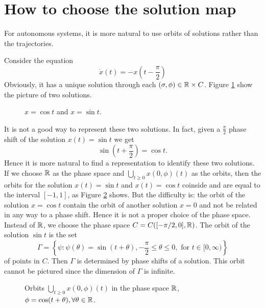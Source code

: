 \section{How to choose the solution map}
For autonomous systems, it is more natural to use orbits of solutions rather than the trajectories.
\begin{example}
Consider the equation
\begin{equation}\label{eqn-2}
  \dot{x}(t)=-x\left( t- \frac{\pi}{2} \right) 
\end{equation}
Obviously, it has a unique solution through each $(\sigma,\phi)\in \mathbb{R}\times C$. Figure \ref{fig-1} show the picture of two solutions.
\begin{figure}[ht]
  \centering
  \caption{$x=\cos t$ and $x=\sin t$.}
  \label{fig-1}
\end{figure}
It is not a good way to represent these two solutions. In fact, given a $\frac{\pi}{2}$ phase shift of the solution $x(t)=\sin t$ we get 
\[
  \sin(t+\frac{\pi}{2})=\cos t.
\] 
Hence it is more natural to find a representation to identify these two solutions. If we choose $\mathbb{R}$ as the phase space and $\bigcup_{t\ge 0}x(0,\phi)(t)$ as the orbits, then the orbits for the solution $x(t)=\sin t$ and $x(t)=\cos t$ coinside and are equal to the interval $[-1,1]$, as Figure \ref{fig-2} shows. But the difficulty is: the orbit of the solution $x=\cos t$ contain the orbit of another solution $x=0$ and not be related in any way to a phase shift. Hence it is not a proper choice of the phase space. Instead of $\mathbb{R}$, we choose the phase space $C=C([-\pi /2,0],\mathbb{R})$. The orbit of the solution $\sin t$ is the set 
\begin{equation}
  \Gamma=\left\{\psi:\psi(\theta)=\sin(t+\theta), -\frac{\pi}{2}\le\theta\le 0, \text{ for }t \in [0,\infty)\right\} 
\end{equation}
of points in $C$. Then  $\Gamma$ is determined by phase shifts of a solution. This orbit cannot be pictured since the dimension of $\Gamma$ is infinite.
\begin{figure}[ht]
  \centering
  \caption{Orbits $\bigcup_{t\ge 0} x(0,\phi)(t)$ in the phase space $\mathbb{R}$, $\phi=\cos (t+\theta),\forall \theta \in \mathbb{R}$.}
  \label{fig-2}
\end{figure}
\end{example}


